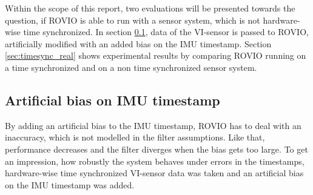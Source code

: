 Within the scope of this report, two evaluations will be presented towards the question, if ROVIO is able to run with a sensor system, which is not hardware-wise time synchronized. In section \ref{sec:timesync_artificial}, data of the VI-sensor is passed to ROVIO, artificially modified with an added bias on the IMU timestamp. Section \ref{sec:timesync_real} shows experimental results by comparing ROVIO running on a time synchronized and on a non time synchronized sensor system.


\subsection{Artificial bias on IMU timestamp}
\label{sec:timesync_artificial}

By adding an artificial bias to the IMU timestamp, ROVIO has to deal with an inaccuracy, which is not modelled in the filter assumptions. Like that, performance decreases and the filter diverges when the bias gets too large. To get an impression, how robustly the system behaves under errors in the timestamps, hardware-wise time synchronized VI-sensor data was taken and an artificial bias on the IMU timestamp was added. \\

